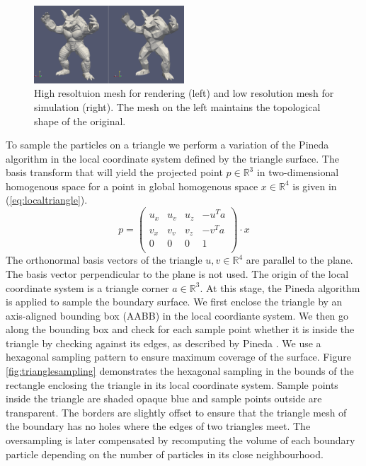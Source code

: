 \documentclass[11pt, letterpaper, twocolumn]{article}
\begin{document}
\begin{figure}[ht]
    \centering
    \includegraphics[width=0.5\textwidth]{images/mesh.png}
    \caption{High resoltuion mesh for rendering (left) and low resolution mesh for simulation (right). The mesh on the left maintains the topological shape of the original.}
    \label{fig:mesh}
\end{figure}
To sample the particles on a triangle we perform a variation of the Pineda algorithm \cite{pineda1988} in the local coordinate system defined by the triangle surface.
The basis transform that will yield the projected point \(p \in \mathbb{R}^3\) in two-dimensional homogenous space for a point in global homogenous space \(x \in \mathbb{R}^4\) is given in (\ref{eq:localtriangle}).
\begin{equation}
  p = 
  \begin{pmatrix}
    u_x & u_v & u_z & -u^T a\\
    v_x & v_v & v_z & -v^T a\\
    0 & 0 & 0 & 1 \\
  \end{pmatrix}
  \cdot x 
\label{eq:localtriangle}
\end{equation}
The orthonormal basis vectors of the triangle \(u, v \in \mathbb{R}^4\) are parallel to the plane. The basis vector perpendicular to the plane is not used. The origin of the local coordinate system is a triangle corner \(a \in \mathbb{R}^3\).
At this stage, the Pineda algorithm is applied to sample the boundary surface. We first enclose the triangle by an axis-aligned bounding box (AABB) in the local coordiante system.
We then go along the bounding box and check for each sample point whether it is inside the triangle by checking against its edges, as described by Pineda \cite{pineda1988}.
We use a hexagonal sampling pattern to ensure maximum coverage of the surface. Figure \ref{fig:trianglesampling} demonstrates the hexagonal sampling in the bounds of the rectangle enclosing the triangle in its local coordinate system. Sample points inside the triangle are shaded opaque blue and sample points outside are transparent. The borders are slightly offset to ensure that the triangle mesh of the boundary has no holes where the edges of two triangles meet.
The oversampling is later compensated by recomputing the volume of each boundary particle depending on the number of particles in its close neighbourhood.
\end{document}
